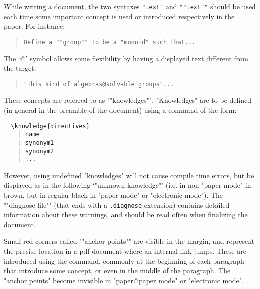 \documentclass{article}
\begin{document}
	\AP While writing a document, the two syntaxes \verb|"text"| and
	\verb|""text""| should be used each time some important concept is used or 
	introduced respectively in the paper. For instance:
	\begin{quote}
	\verb|Define a ""group"" to be a "monoid" such that...|
	\end{quote}
	The `@' symbol allows some flexibility by having a displayed text different 
	from the target:
	\begin{quote}
	\verb|"This kind of algebras@solvable groups"...|
	\end{quote}

\AP These concepts are referred to as ""knowledges"". "Knowledges" are to be defined (in general in the preamble of the document) using a command of the form:

\begin{verbatim}
  \knowledge{directives}
    | name
    | synonym1
    | synonym2
    | ...
\end{verbatim}

However, using undefined "knowledges" will not cause compile time errors, 
but be displayed as in the following `"unknown knowledge"' (i.e. in 
non-"paper mode" in brown, but in regular black in "paper mode" or 
"electronic mode").
The \AP""diagnose file"" (that ends with a \texttt{.diagnose} extension) 
contains detailed information about these warnings, and should be read 
often when finalizing the document.

Small red corners called \AP""anchor points"" are visible in the margin, and 
represent the precise location in a pdf document where an internal link jumps. 
These are introduced
using the \texttt{\detokenize{\AP}}command, commonly at the beginning of each 
paragraph that introduce some concept, or even in the middle of the paragraph. 
The "anchor points" become invisible in "paper@paper mode" or "electronic mode".
\end{document}
